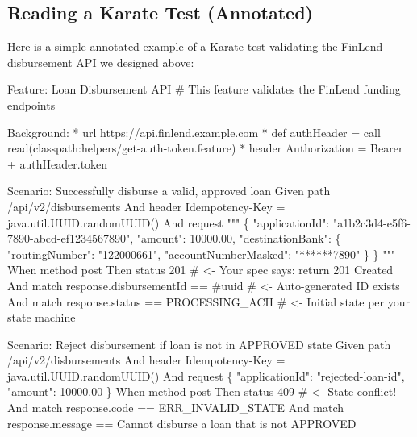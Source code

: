 \documentclass[
  11pt,
  openany,
  oneside]{book}
\newenvironment{Shaded}{}{}
\newcommand{\NormalTok}[1]{#1}
\begin{document}
\subsection{Reading a Karate Test
(Annotated)}\label{reading-a-karate-test-annotated}

Here is a simple annotated example of a Karate test validating the
FinLend disbursement API we designed above:

\begin{Shaded}
\begin{Highlighting}[]
\NormalTok{Feature: Loan Disbursement API}
\NormalTok{  \# This feature validates the FinLend funding endpoints}

\NormalTok{  Background:}
\NormalTok{    * url \textquotesingle{}https://api.finlend.example.com\textquotesingle{}}
\NormalTok{    * def authHeader = call read(\textquotesingle{}classpath:helpers/get{-}auth{-}token.feature\textquotesingle{})}
\NormalTok{    * header Authorization = \textquotesingle{}Bearer \textquotesingle{} + authHeader.token}

\NormalTok{  Scenario: Successfully disburse a valid, approved loan}
\NormalTok{    Given path \textquotesingle{}/api/v2/disbursements\textquotesingle{}}
\NormalTok{    And header Idempotency{-}Key = java.util.UUID.randomUUID()}
\NormalTok{    And request}
\NormalTok{    """}
\NormalTok{    \{}
\NormalTok{      "applicationId": "a1b2c3d4{-}e5f6{-}7890{-}abcd{-}ef1234567890",}
\NormalTok{      "amount": 10000.00,}
\NormalTok{      "destinationBank": \{}
\NormalTok{        "routingNumber": "122000661",}
\NormalTok{        "accountNumberMasked": "******7890"}
\NormalTok{      \}}
\NormalTok{    \}}
\NormalTok{    """}
\NormalTok{    When method post}
\NormalTok{    Then status 201                                 \# \textless{}{-} Your spec says: return 201 Created}
\NormalTok{    And match response.disbursementId == \textquotesingle{}\#uuid\textquotesingle{}    \# \textless{}{-} Auto{-}generated ID exists}
\NormalTok{    And match response.status == \textquotesingle{}PROCESSING\_ACH\textquotesingle{}   \# \textless{}{-} Initial state per your state machine}

\NormalTok{  Scenario: Reject disbursement if loan is not in APPROVED state}
\NormalTok{    Given path \textquotesingle{}/api/v2/disbursements\textquotesingle{}}
\NormalTok{    And header Idempotency{-}Key = java.util.UUID.randomUUID()}
\NormalTok{    And request \{ "applicationId": "rejected{-}loan{-}id", "amount": 10000.00 \}}
\NormalTok{    When method post}
\NormalTok{    Then status 409                                 \# \textless{}{-} State conflict!}
\NormalTok{    And match response.code == \textquotesingle{}ERR\_INVALID\_STATE\textquotesingle{}}
\NormalTok{    And match response.message == \textquotesingle{}Cannot disburse a loan that is not APPROVED\textquotesingle{}}
\end{Highlighting}
\end{Shaded}
\end{document}
